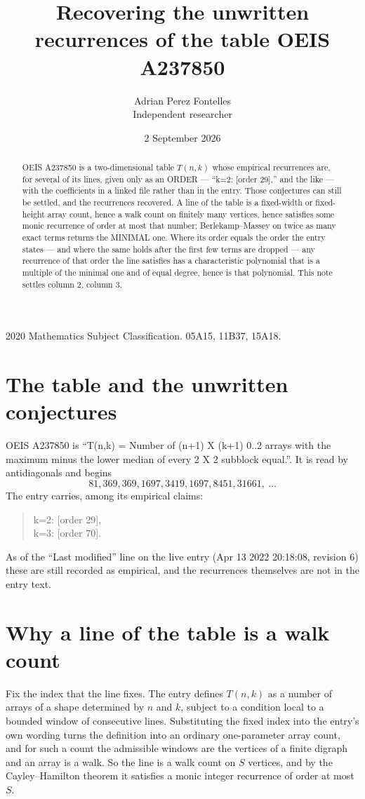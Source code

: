 \documentclass[11pt,a4paper]{article}
\title{Recovering the unwritten recurrences of the table OEIS A237850}
\author{Adrian Perez Fontelles\\ \small Independent researcher}
\date{2 September 2026}
\theoremstyle{plain}
\theoremstyle{definition}
\begin{document}
\maketitle

\begin{abstract}
OEIS A237850 is a two-dimensional table $T(n,k)$ whose empirical recurrences are, for several of
its lines, given only as an ORDER --- ``k=2: [order 29],'' and the like --- with the
coefficients in a linked file rather than in the entry. Those conjectures can still be settled,
and the recurrences recovered. A line of the table is a fixed-width or fixed-height array
count, hence a walk count on finitely many vertices, hence satisfies some monic recurrence of
order at most that number; Berlekamp--Massey on twice as many exact terms returns the MINIMAL
one. Where its order equals the order the entry states --- and where the same holds after the
first few terms are dropped --- any recurrence of that order the line satisfies has a
characteristic polynomial that is a multiple of the minimal one and of equal degree, hence is
that polynomial. This note settles column 2, column 3.
\end{abstract}

\noindent\small 2020 Mathematics Subject Classification. 05A15, 11B37, 15A18.\normalsize

\section{The table and the unwritten conjectures}

OEIS A237850 is ``T(n,k) = Number of (n+1) X (k+1) 0..2 arrays with the maximum minus the lower median of every 2 X 2 subblock equal.''. It is read by antidiagonals and begins
\[
81, 369, 369, 1697, 3419, 1697, 8451, 31661,\ \dots
\]
The entry carries, among its empirical claims:
\begin{quote}\small
k=2: [order 29],\\
k=3: [order 70].
\end{quote}
As of the ``Last modified'' line on the live entry (Apr 13 2022 20:18:08, revision 6) these are still
recorded as empirical, and the recurrences themselves are not in the entry text.

\section{Why a line of the table is a walk count}

Fix the index that the line fixes. The entry defines $T(n,k)$ as a number of arrays of a shape
determined by $n$ and $k$, subject to a condition local to a bounded window of consecutive
lines. Substituting the fixed index into the entry's own wording turns the definition into an
ordinary one-parameter array count, and for such a count the admissible windows are the
vertices of a finite digraph and an array is a walk. So the line is a walk count on $S$
vertices, and by the Cayley--Hamilton theorem it satisfies a monic integer recurrence of order
at most $S$.
\end{document}

